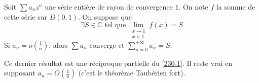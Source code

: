 	\begin{theorem}
		Soit $\sum a_n z^n$ une série entière de rayon de convergence $1$. On note $f$ la somme de cette série sur $D(0,1)$. On suppose que
		\[ \exists S \in \mathbb{C} \text{ tel que } \lim_{\substack{x \rightarrow 1 \\ x < 1}} f(x) = S \]
		Si $a_n = o \left( \frac{1}{n} \right)$, alors $\sum a_n$ converge et $\sum_{n=0}^{+\infty} a_n = S$.
	\end{theorem}
	
	\begin{remark}
		Ce dernier résultat est une réciproque partielle du \cref{230-1}. Il reste vrai en supposant $a_n = O \left( \frac{1}{n} \right)$ (c'est le théorème Taubérien fort).
	\end{remark}
